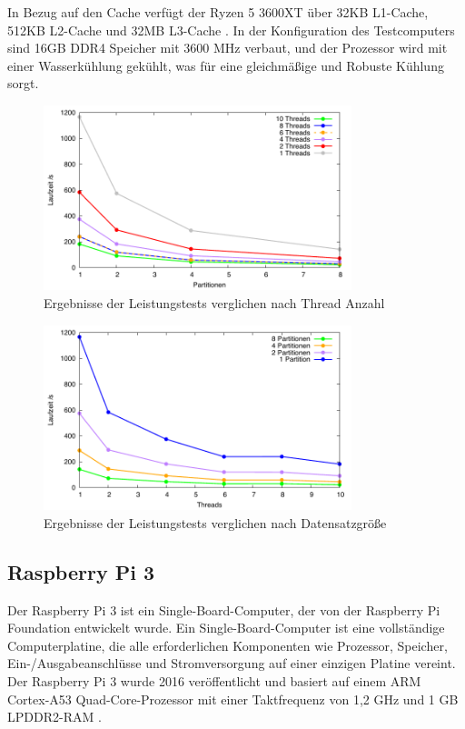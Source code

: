 In Bezug auf den Cache verfügt der Ryzen 5 3600XT über 32KB L1-Cache, 512KB L2-Cache und 32MB L3-Cache \citep{Ryzen_Technische_Daten}. In der Konfiguration des Testcomputers sind 16GB DDR4 Speicher mit 3600 MHz verbaut, und der Prozessor wird mit einer Wasserkühlung gekühlt, was für eine gleichmäßige und Robuste Kühlung sorgt.

\begin{figure}[htbp!]
\centering
\includegraphics[width=0.8\textwidth]{../results/plots/3600xt/comp_all_threads.pdf}
\caption{Ergebnisse der Leistungstests verglichen nach Thread Anzahl}
\label{fig:ryzen_benchmark_threads}
\end{figure}

\begin{figure}[htbp!]
\centering
\includegraphics[width=0.8\textwidth]{../results/plots/3600xt/comp_all_partitions.pdf}
\caption{Ergebnisse der Leistungstests verglichen nach Datensatzgröße}
\label{fig:ryzen_benchmark_partitions}
\end{figure}

\subsection{Raspberry Pi 3}
Der Raspberry Pi 3 ist ein Single-Board-Computer, der von der Raspberry Pi Foundation entwickelt wurde. Ein Single-Board-Computer ist eine vollständige Computerplatine, die alle erforderlichen Komponenten wie Prozessor, Speicher, Ein-/Ausgabeanschlüsse und Stromversorgung auf einer einzigen Platine vereint. Der Raspberry Pi 3 wurde 2016 veröffentlicht und basiert auf einem ARM Cortex-A53 Quad-Core-Prozessor mit einer Taktfrequenz von 1,2 GHz und 1 GB LPDDR2-RAM \citep{RaspberryPi_Technische_Daten}.

